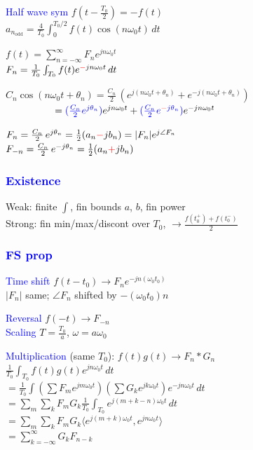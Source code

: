 \documentclass[4pt]{article}
\theoremstyle{definition}
\theoremstyle{definition}
\renewcommand{\o}{\omega}
\newcommand{\ra}{\rightarrow}
\newcommand{\red}[1]{\textcolor{red}{#1}}
\newcommand{\blue}[1]{\textcolor{blue}{#1}}
\begin{document}
\begin{landscape}
\begin{multicols}{3}
    \blue{Half wave sym} $f(t - \frac{T_0}{2}) = -f(t)$\\
    $a_{n_\mathrm{odd}} = \frac{4}{T_0}\int_{0}^{T_0/2} f(t) \cos (n\o_0 t) \, dt$

    $f(t) = \sum_{n=-\infty}^{\infty} F_n e^{jn\o_0 t}$\\
    $F_n = \frac{1}{T_0}\int_{T_0} f(t) e^{\red{-}jn\o_0t}\,dt$

    $C_n\cos(n\o_0 t + \theta_n) = \frac{C_n}{2} \, (e^{j(n\o_0t + \theta_n)} + e^{-j(n\o_0 t + \theta_n)})$\\
    $ \hspace{5em}= \blue{(\frac{C_n} 2 e^{j\theta_n})} e^{jn\o_0 t} + \blue{(\frac{C_n} 2 e^{\red{-}j\theta_n})} e^{-jn\o_0 t}$

    $F_n = \frac{C_n}{2}\, e^{j\theta_n} = \frac 1 2 (a_n \red{-} jb_n) = |F_n| e^{j\angle F_n}$\\
    $F_{-n} = \frac{C_n}{2}\, e^{-j\theta_n} = \frac 1 2 (a_n \red{+} jb_n)$ 
\subsubsection*{\blue{Existence}}
    Weak: finite $\int$, fin bounds $a$, $b$, fin power\\

    Strong: fin min/max/discont over $T_0$, $\ra \frac{f(t_0^+) + f(t_0^-)}{2}$
\subsubsection*{\blue{FS prop}}
    \blue{Time shift} $f(t-t_0)\ra F_n e^{-jn(\o_0 t_0)}$\\
        \hspace{1em} $|F_n|$ same; $\angle F_n$ shifted by $-(\o_0 t_0)n$

    \blue{Reversal} $f(-t)\ra F_{-n}$\\
    \blue{Scaling} $T = \frac {T_0} a$, $\o = a\o_0$

    \blue{Multiplication} (same $T_0$): $f(t) g(t) \ra F_n * G_n$\\ 
        \hspace{1em} $\frac 1{T_0}  \int_{T_0} f(t) g(t) e^{jn\o_0 t}\, dt$\\
        \hspace{1em} $ = \frac{1}{T_0} \int (\sum F_m e^{jm\o_0 t}) (\sum G_k e^{jk\o_0 t}) e^{-jn\o_0 t} \, dt$ \\
        \hspace{1em} $ = \sum_m \sum_k F_m G_k \frac{1}{T_0} \int_{T_0} e^{j(m+k-n)\o_0 t} \, dt$\\
        \hspace{1em} $ = \sum_m \sum_k F_m G_k \langle e^{j(m+k)\o_0 t}, e^{jn\o_0 t}\rangle$\\
        \hspace{1em} $ = \sum_{k=-\infty}^{\infty} G_k F_{n-k}$
        

\end{multicols}
\end{landscape}
\end{document}
